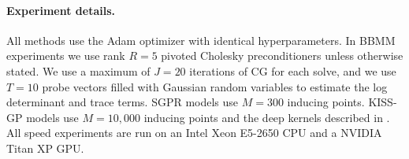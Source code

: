 \paragraph{Experiment details.}
All methods use the Adam optimizer \cite{kingma2014adam} with identical hyperparameters.
In BBMM experiments we use rank $R\!=\!5$ pivoted Cholesky preconditioners unless otherwise stated.
We use a maximum of $J\!=\!20$ iterations of CG for each solve, and
we use $T\!=\!10$ probe vectors filled with Gaussian random variables to estimate the log determinant and trace terms.
SGPR models use $M\!=\!300$ inducing points.
KISS-GP models use $M\!=\!10,\!000$ inducing points and the deep kernels described in \cite{wilson2016deep}.
All speed experiments are run on an Intel Xeon E5-2650 CPU and a NVIDIA Titan XP GPU.

